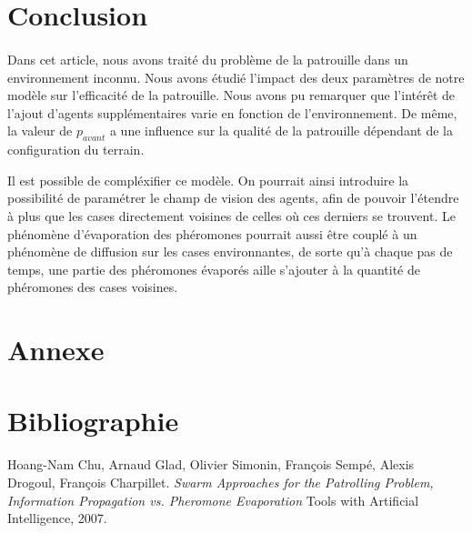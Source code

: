 \documentclass{article}
\begin{document}
\section{Conclusion}
\paragraph{} Dans cet article, nous avons traité du problème de la patrouille dans un environnement inconnu.
Nous avons étudié l'impact des deux paramètres de notre modèle sur l'efficacité de la patrouille. Nous avons pu remarquer que 
l'intérêt de l'ajout d'agents supplémentaires varie en fonction de l'environnement. De même, la valeur de $p_{avant}$ a une influence sur la 
qualité de la patrouille dépendant de la configuration du terrain.

Il est possible de compléxifier ce modèle. On pourrait ainsi introduire la possibilité de paramétrer le champ de vision des agents, afin de pouvoir l'étendre à plus que les cases directement voisines de celles où ces derniers se trouvent.
Le phénomène d'évaporation des phéromones pourrait aussi être couplé à un phénomène de diffusion sur les cases environnantes, de sorte qu'à chaque pas de temps, une partie des phéromones évaporés aille s'ajouter à la quantité de phéromones des cases voisines.

\appendix
\section*{Annexe}
\listoffigures
\section*{Bibliographie}
\begin{thebibliography}{1}
    Hoang-Nam Chu, Arnaud Glad, Olivier Simonin, François Sempé, Alexis Drogoul, François Charpillet.
    \textit{Swarm Approaches for the Patrolling Problem, Information Propagation vs. Pheromone Evaporation}
    Tools with Artificial Intelligence, 2007.
\end{thebibliography}
\end{document}
